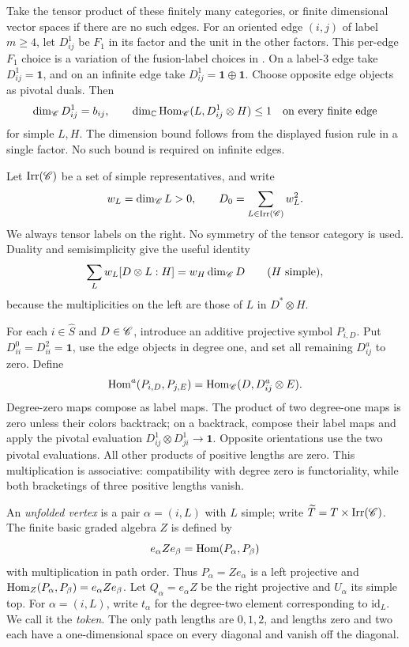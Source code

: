 Take the tensor product of these finitely many categories, or finite
dimensional vector spaces if there are no such edges.  For an
oriented edge $(i,j)$ of label $m\geq4$, let $D^1_{ij}$ be $F_1$ in
its factor and the unit in the other factors.  This per-edge $F_1$
choice is a variation of the fusion-label choices in
\cite[Section~4.3, Equation~(15), and Remark~4.4]{HengLicata2024}.
On a label-$3$ edge
take $D^1_{ij}=\mathbf1$, and on an infinite edge take
$D^1_{ij}=\mathbf1\oplus\mathbf1$.  Choose opposite edge objects
as pivotal duals.  Then
\begin{equation}
 \dim_{\mathscr C}D^1_{ij}=b_{ij},\qquad
 \dim_\mathbb C\operatorname{Hom}_{\mathscr C}(L,D^1_{ij}\otimes H)\leq1
 \quad\text{on every finite edge}
 \label{cat:edge-labels}
\end{equation}
for simple $L,H$.  The dimension bound follows from the displayed
fusion rule in a single factor.  No such bound is required on
infinite edges.

Let $\operatorname{Irr}(\mathscr C)$ be a set of simple representatives, and
write
\[
 w_L=\dim_{\mathscr C}L>0,
 \qquad D_0=\sum_{L\in\operatorname{Irr}(\mathscr C)}w_L^2.
\]
We always tensor labels on the right.  No symmetry of the tensor
category is used.  Duality and semisimplicity give the useful identity
\begin{equation}
 \sum_L w_L[D\otimes L:H]=w_H\dim_{\mathscr C}D
 \qquad(H\text{ simple}),
 \label{cat:weighted-labels}
\end{equation}
because the multiplicities on the left are those of $L$ in
$D^*\otimes H$.

For each $i\in\widehat S$ and $D\in\mathscr C$, introduce an additive
projective symbol $P_{i,D}$.  Put
$D^0_{ii}=D^2_{ii}=\mathbf1$, use the edge objects in degree one,
and set all remaining $D^a_{ij}$ to zero.  Define
\begin{equation}
 \operatorname{Hom}^a(P_{i,D},P_{j,E})
       =\operatorname{Hom}_{\mathscr C}(D,D^a_{ij}\otimes E).
 \label{cat:projective-hom}
\end{equation}
Degree-zero maps compose as label maps.  The product of two
degree-one maps is zero unless their colors backtrack; on a
backtrack, compose their label maps and apply the pivotal evaluation
$D^1_{ij}\otimes D^1_{ji}\to\mathbf1$.  Opposite orientations use
the two pivotal evaluations.  All other products of positive lengths
are zero.  This multiplication is associative: compatibility with
degree zero is functoriality, while both bracketings of three
positive lengths vanish.

An \emph{unfolded vertex} is a pair $\alpha=(i,L)$ with $L$ simple;
write $\widetilde T=T\times\operatorname{Irr}(\mathscr C)$.  The finite
basic graded algebra $Z$ is defined by
\[
 e_\alpha Z e_\beta=\operatorname{Hom}(P_\alpha,P_\beta)
\]
with multiplication in path order.  Thus $P_\alpha=Ze_\alpha$ is
a left projective and
$\operatorname{Hom}_Z(P_\alpha,P_\beta)=e_\alpha Z e_\beta$.  Let
$Q_\alpha=e_\alpha Z$ be the right projective and $U_\alpha$ its
simple top.  For $\alpha=(i,L)$, write $t_\alpha$ for the
degree-two element corresponding to $\mathrm{id}_L$.  We call it
the \emph{token}.  The only path lengths are $0,1,2$, and lengths
zero and two each have a one-dimensional space on every diagonal
and vanish off the diagonal.

